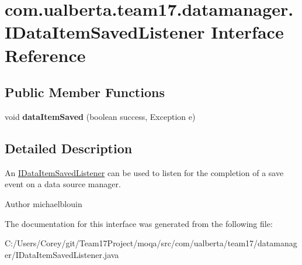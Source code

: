 \hypertarget{interfacecom_1_1ualberta_1_1team17_1_1datamanager_1_1_i_data_item_saved_listener}{\section{com.\+ualberta.\+team17.\+datamanager.\+I\+Data\+Item\+Saved\+Listener Interface Reference}
\label{interfacecom_1_1ualberta_1_1team17_1_1datamanager_1_1_i_data_item_saved_listener}
}
\subsection*{Public Member Functions}
\begin{DoxyCompactItemize}
\item 
\hypertarget{interfacecom_1_1ualberta_1_1team17_1_1datamanager_1_1_i_data_item_saved_listener_a0fdb3059d9a07c4df9644da784ecea86}{void {\bfseries data\+Item\+Saved} (boolean success, Exception e)}\label{interfacecom_1_1ualberta_1_1team17_1_1datamanager_1_1_i_data_item_saved_listener_a0fdb3059d9a07c4df9644da784ecea86}

\end{DoxyCompactItemize}


\subsection{Detailed Description}
An \hyperlink{interfacecom_1_1ualberta_1_1team17_1_1datamanager_1_1_i_data_item_saved_listener}{I\+Data\+Item\+Saved\+Listener} can be used to listen for the completion of a save event on a data source manager.

\begin{DoxyAuthor}{Author}
michaelblouin 
\end{DoxyAuthor}


The documentation for this interface was generated from the following file\+:\begin{DoxyCompactItemize}
\item 
C\+:/\+Users/\+Corey/git/\+Team17\+Project/moqa/src/com/ualberta/team17/datamanager/I\+Data\+Item\+Saved\+Listener.\+java\end{DoxyCompactItemize}
